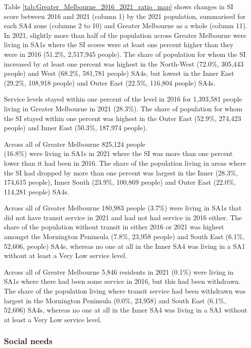 \documentclass[preprint, 3p,
authoryear]{elsarticle} %
\begin{document}
Table \ref{tab:Greater_Melbourne_2016_2021_ratio_map} shows changes in
SI score between 2016 and 2021 (column 1) by the 2021 population,
summarised for each SA4 zone (columns 2 to 10) and Greater Melbourne as
a whole (column 11). In 2021, slightly more than half of the population
across Greater Melbourne were living in SA1s where the SI scores were at
least one percent higher than they were in 2016 (51.2\%, 2,517,945
people). The share of population for whom the SI increased by at least
one percent was highest in the North-West (72.0\%, 305,443 people) and
West (68.2\%, 581,781 people) SA4s, but lowest in the Inner East
(29.2\%, 108,918 people) and Outer East (22.5\%, 116,804 people) SA4s.

Service levels stayed within one percent of the level in 2016 for
1,393,581 people living in Greater Melbourne in 2021 (28.3\%). The share
of population for whom the SI stayed within one percent was highest in
the Outer East (52.9\%, 274,423 people) and Inner East (50.3\%, 187,974
people).

Across all of Greater Melbourne 825,124 people\\
(16.8\%) were living in SA1s in 2021 where the SI was more than one
percent lower than it had been in 2016. The share of the population
living in areas where the SI had dropped by more than one percent was
largest in the Inner (28.3\%, 174,615 people), Inner South (23.9\%,
100,869 people) and Outer East (22.0\%, 114,281 people) SA4s.

Across all of Greater Melbourne 180,983 people (3.7\%) were living in
SA1s that did not have transit service in 2021 and had not had service
in 2016 either. The share of the population without transit in either
2016 or 2021 was highest amongst the Mornington Peninsula (7.8\%, 23,958
people) and South East (6.1\%, 52,606, people) SA4s, whereas no one at
all in the Inner SA4 was living in a SA1 without at least a Very Low
service level.

Across all of Greater Melbourne 5,846 residents in 2021 (0.1\%) were
living in SA1s where there had been some service in 2016, but this had
been withdrawn. The share of the population living where transit service
had been withdrawn was largest in the Mornington Peninsula (0.0\%,
23,958) and South East (6.1\%, 52,606) SA4s, whereas no one at all in
the Inner SA4 was living in a SA1 without at least a Very Low service
level.

\subsubsection{Social needs}\label{social-needs}
\end{document}

